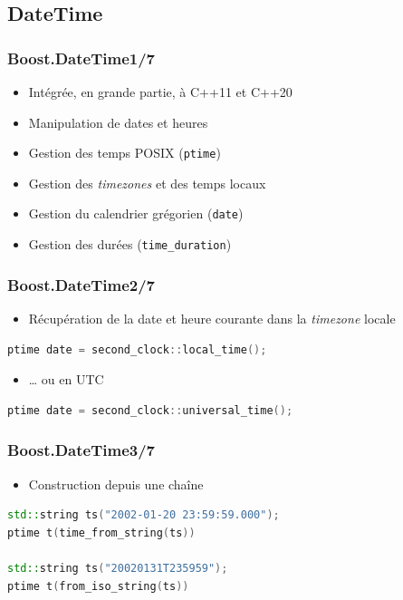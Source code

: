 \documentclass[C++.tex]{subfiles}
\begin{document}
\subsection*{DateTime}
\begin{frame}[fragile]
	\frametitle{Boost.DateTime\titlehfill{}1/7}
	\begin{itemize}
		\item Intégrée, en grande partie, à C++11 et C++20
		\item Manipulation de dates et heures
		\item Gestion des temps POSIX (\lstinline|ptime|)
		\item Gestion des \textit{timezones} et des temps locaux
		\item Gestion du calendrier grégorien (\lstinline|date|)
		\item Gestion des durées (\lstinline|time_duration|)
	\end{itemize}
\end{frame}

\begin{frame}[fragile]
	\frametitle{Boost.DateTime\titlehfill{}2/7}
	\begin{itemize}
		\item Récupération de la date et heure courante dans la \textit{timezone} locale
	\end{itemize}

	\begin{lstlisting}[language=C++]
ptime date = second_clock::local_time();\end{lstlisting}

	\begin{itemize}
		\item \ldots{} ou en UTC
	\end{itemize}

	\begin{lstlisting}[language=C++]
ptime date = second_clock::universal_time();\end{lstlisting}
\end{frame}

\begin{frame}[fragile]
	\frametitle{Boost.DateTime\titlehfill{}3/7}
	\begin{itemize}
		\item Construction depuis une chaîne
	\end{itemize}

	\begin{lstlisting}[language=C++]
std::string ts("2002-01-20 23:59:59.000");
ptime t(time_from_string(ts))

std::string ts("20020131T235959");
ptime t(from_iso_string(ts))\end{lstlisting}
\end{frame}
\end{document}
